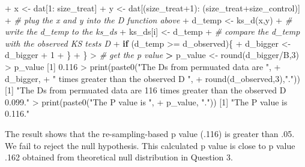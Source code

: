 \documentclass[
]{article}
\newenvironment{Shaded}{\begin{snugshade}}{\end{snugshade}}
\newcommand{\CommentTok}[1]{\textcolor[rgb]{0.56,0.35,0.01}{\textit{#1}}}
\newcommand{\ControlFlowTok}[1]{\textcolor[rgb]{0.13,0.29,0.53}{\textbf{#1}}}
\newcommand{\DecValTok}[1]{\textcolor[rgb]{0.00,0.00,0.81}{#1}}
\newcommand{\ErrorTok}[1]{\textcolor[rgb]{0.64,0.00,0.00}{\textbf{#1}}}
\newcommand{\FloatTok}[1]{\textcolor[rgb]{0.00,0.00,0.81}{#1}}
\newcommand{\FunctionTok}[1]{\textcolor[rgb]{0.00,0.00,0.00}{#1}}
\newcommand{\NormalTok}[1]{#1}
\newcommand{\OtherTok}[1]{\textcolor[rgb]{0.56,0.35,0.01}{#1}}
\newcommand{\SpecialCharTok}[1]{\textcolor[rgb]{0.00,0.00,0.00}{#1}}
\newcommand{\StringTok}[1]{\textcolor[rgb]{0.31,0.60,0.02}{#1}}
\begin{document}
\begin{Shaded}
\begin{Highlighting}[]
\SpecialCharTok{+}\NormalTok{   x }\OtherTok{\textless{}{-}}\NormalTok{ dat[}\DecValTok{1}\SpecialCharTok{:}\NormalTok{ size\_treat]}
\SpecialCharTok{+}\NormalTok{   y }\OtherTok{\textless{}{-}}\NormalTok{ dat[(size\_treat}\SpecialCharTok{+}\DecValTok{1}\NormalTok{)}\SpecialCharTok{:}\NormalTok{ (size\_treat}\SpecialCharTok{+}\NormalTok{size\_control)]}
\SpecialCharTok{+}   \CommentTok{\# plug the x and y into the D function above}
\SpecialCharTok{+}\NormalTok{   d\_temp }\OtherTok{\textless{}{-}} \FunctionTok{ks\_d}\NormalTok{(x,y)}
\SpecialCharTok{+}   \CommentTok{\# write the d\_temp to the ks\_ds}
\SpecialCharTok{+}\NormalTok{   ks\_ds[i] }\OtherTok{\textless{}{-}}\NormalTok{ d\_temp}
\SpecialCharTok{+}   \CommentTok{\# compare the d\_temp with the observed KS test\textquotesingle{}s D}
\SpecialCharTok{+}   \ControlFlowTok{if}\NormalTok{ (d\_temp }\SpecialCharTok{\textgreater{}=}\NormalTok{ d\_observed)\{}
\SpecialCharTok{+}\NormalTok{     d\_bigger }\OtherTok{\textless{}{-}}\NormalTok{ d\_bigger }\SpecialCharTok{+} \DecValTok{1}
\SpecialCharTok{+}\NormalTok{   \}}
\SpecialCharTok{+}\NormalTok{ \}}
\SpecialCharTok{\textgreater{}} \CommentTok{\# get the p value}
\ErrorTok{\textgreater{}}\NormalTok{ p\_value }\OtherTok{\textless{}{-}} \FunctionTok{round}\NormalTok{(d\_bigger}\SpecialCharTok{/}\NormalTok{B,}\DecValTok{3}\NormalTok{)}
\SpecialCharTok{\textgreater{}}\NormalTok{ p\_value}
\NormalTok{[}\DecValTok{1}\NormalTok{] }\FloatTok{0.116}
\SpecialCharTok{\textgreater{}} \FunctionTok{print}\NormalTok{(}\FunctionTok{paste0}\NormalTok{(}\StringTok{"The Ds from permuated data are "}\NormalTok{, }
\SpecialCharTok{+}\NormalTok{              d\_bigger, }
\SpecialCharTok{+}              \StringTok{" times greater than the observed D "}\NormalTok{,}
\SpecialCharTok{+}              \FunctionTok{round}\NormalTok{(d\_observed,}\DecValTok{3}\NormalTok{),}\StringTok{"."}\NormalTok{))}
\NormalTok{[}\DecValTok{1}\NormalTok{] }\StringTok{"The Ds from permuated data are 116 times greater than the observed D 0.099."}
\SpecialCharTok{\textgreater{}} \FunctionTok{print}\NormalTok{(}\FunctionTok{paste0}\NormalTok{(}\StringTok{"The P value is "}\NormalTok{, }
\SpecialCharTok{+}\NormalTok{              p\_value, }\StringTok{"."}\NormalTok{))}
\NormalTok{[}\DecValTok{1}\NormalTok{] }\StringTok{"The P value is 0.116."}
\end{Highlighting}
\end{Shaded}

The result shows that the re-sampling-based p value (.116) is greater
than .05. We fail to reject the null hypothesis. This calculated p value
is close to p value .162 obtained from theoretical null distribution in
Question 3.
\end{document}
